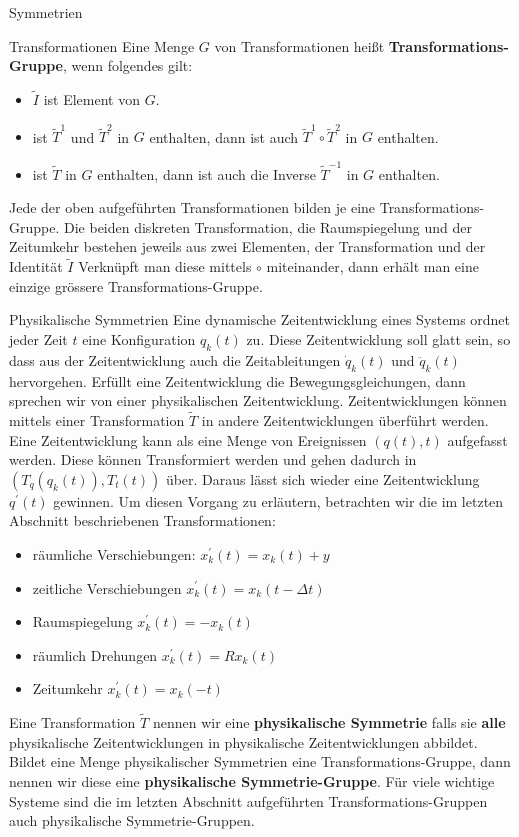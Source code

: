 \documentclass[a4paper,fleqn]{article}
\numberwithin{equation}{section}
\begin{document}
\begin{section}{Symmetrien}
\begin{subsection}{Transformationen}
Eine Menge $G$ von Transformationen heißt \textbf{Transformations-Gruppe}, wenn folgendes gilt:
\begin{itemize}
	\item $\tilde{I}$ ist Element von $G$.
	\item ist $\tilde{T}^1$ und $\tilde{T}^2$ in $G$ enthalten, dann ist auch $\tilde{T}^1\circ\tilde{T}^2$ in $G$ enthalten.
	\item ist $\tilde{T}$ in $G$ enthalten, dann ist auch die Inverse $\tilde{T}^{-1}$ in $G$ enthalten.
\end{itemize}
Jede der oben aufgeführten Transformationen bilden je eine Transformations-Gruppe. Die beiden diskreten Transformation, die  Raumspiegelung und der Zeitumkehr bestehen jeweils aus zwei Elementen, der Transformation und der Identität $\tilde{I}$
Verknüpft man diese mittels $\circ$ miteinander, dann erhält man eine einzige grössere Transformations-Gruppe.
\end{subsection}

\begin{subsection}{Physikalische Symmetrien}
Eine dynamische Zeitentwicklung eines Systems ordnet jeder Zeit $t$ eine Konfiguration $q_k(t)$ zu. Diese Zeitentwicklung soll glatt sein, so
dass aus der Zeitentwicklung auch die Zeitableitungen $\dot{q}_k(t)$ und $\ddot{q}_k(t)$ hervorgehen. Erfüllt eine Zeitentwicklung die Bewegungsgleichungen, dann sprechen wir von einer physikalischen Zeitentwicklung. Zeitentwicklungen können mittels einer Transformation $\tilde{T}$ in andere Zeitentwicklungen überführt werden. Eine Zeitentwicklung kann als eine Menge von Ereignissen $(q(t),t)$ aufgefasst werden. Diese können Transformiert werden und gehen dadurch in $(T_q(q_k(t)),T_t(t))$ über. Daraus lässt sich wieder eine Zeitentwicklung $q^\prime(t)$ gewinnen. Um diesen Vorgang zu erläutern, betrachten wir die im letzten Abschnitt beschriebenen Transformationen:
\begin{itemize}
	\item räumliche Verschiebungen: $x_k^\prime(t) = x_k(t)+y$
	\item zeitliche Verschiebungen $x_k^\prime(t) = x_k(t-\Delta t)$
	\item Raumspiegelung $x_k^\prime(t) = -x_k(t)$
	\item räumlich Drehungen $x_k^\prime(t) = Rx_k(t)$
	\item Zeitumkehr $x_k^\prime(t) = x_k(-t)$
\end{itemize}
Eine Transformation $\tilde{T}$ nennen wir eine \textbf{physikalische Symmetrie} falls sie \textbf{alle} physikalische 
Zeitentwicklungen in physikalische Zeitentwicklungen abbildet. Bildet eine Menge physikalischer Symmetrien eine Transformations-Gruppe,
dann nennen wir diese eine \textbf{physikalische Symmetrie-Gruppe}. Für viele wichtige Systeme sind die im letzten Abschnitt aufgeführten Transformations-Gruppen auch physikalische Symmetrie-Gruppen.
\end{subsection}


\end{section}
\end{document}
